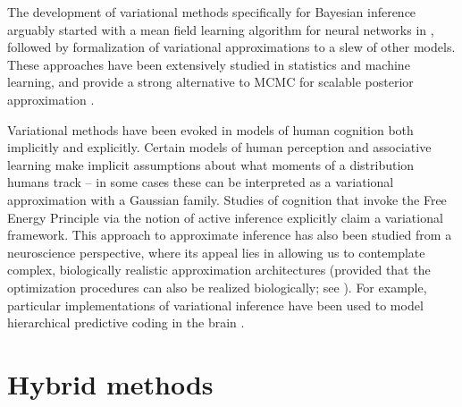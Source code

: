 The development of variational methods specifically for Bayesian inference arguably started with a mean field learning algorithm for neural networks in \citet{anderson1987mean}, followed by formalization of variational approximations to a slew of other models\citep{saul1996mean, jaakkola1997variational}. These approaches have been extensively studied in statistics and machine learning, and provide a strong alternative to MCMC for scalable posterior approximation \citep{blei2017variational, jordan1999introduction}.

Variational methods have been evoked in models of human cognition both implicitly and explicitly. Certain models of human perception\cite{lau2018ensemble} and associative learning\cite{gershman2015unifying} make implicit assumptions about what moments of a distribution humans track -- in some cases these can be interpreted as a variational approximation with a Gaussian family. Studies of cognition that invoke the Free Energy Principle via the notion of active inference\cite{friston2015active}
explicitly claim a variational framework. This approach to approximate inference has also been studied from a neuroscience perspective, where its appeal lies in allowing us to contemplate complex, biologically realistic approximation architectures (provided that the optimization procedures can also be realized biologically; see \citet{whittington2019theories}). For example, particular implementations of variational inference have been used to model hierarchical predictive coding in the brain \citep{friston2008hierarchical,gershman2019does}.


\section{Hybrid methods}
%

